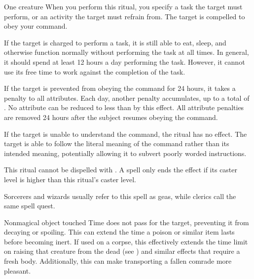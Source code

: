\spellrng{\rngmed}
\begin{spelltarget}{One creature}
    \spelleffect When you perform this ritual, you specify a task the target must perform, or an activity the target must refrain from. The target is compelled to obey your command.

    If the target is charged to perform a task, it is still able to eat, sleep, and otherwise function normally without performing the task at all times. In general, it should spend at least 12 hours a day performing the task. However, it cannot use its free time to work against the completion of the task.

    \par If the target is prevented from obeying the command for 24 hours, it takes a  penalty to all attributes. Each day, another  penalty accumulates, up to a total of . No attribute can be reduced to less than  by this effect. All attribute penalties are removed 24 hours after the subject resumes obeying the command.
\end{spelltarget}
\spellnotes If the target is unable to understand the command, the ritual has no effect. The target is able to follow the literal meaning of the command rather than its intended meaning, potentially allowing it to subvert poorly worded instructions.

\par This ritual cannot be dispelled with . A  spell only ends the effect if its caster level is higher than this ritual's caster level.

\par Sorcerers and wizards usually refer to this spell as geas, while clerics call the same spell quest.

\begin{spelltarget}{Nonmagical object touched}
    \spelleffect Time does not pass for the target, preventing it from decaying or spoiling. This can extend the time a poison or similar item lasts before becoming inert. If used on a corpse, this effectively extends the time limit on raising that creature from the dead (see ) and similar effects that require a fresh body. Additionally, this can make transporting a fallen comrade more pleasant.
\end{spelltarget}

